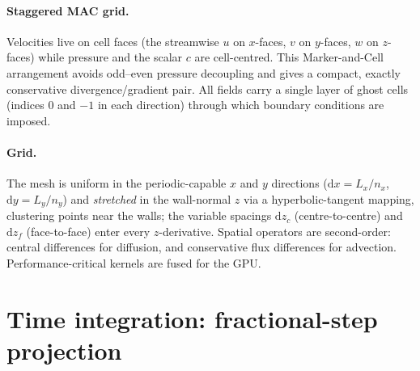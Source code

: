 \documentclass[11pt]{article}
\newcommand{\dd}{\mathrm{d}}
\begin{document}
\paragraph{Staggered MAC grid.} Velocities live on cell faces (the
streamwise $u$ on $x$-faces, $v$ on $y$-faces, $w$ on $z$-faces) while
pressure and the scalar $c$ are cell-centred. This Marker-and-Cell
arrangement avoids odd--even pressure decoupling and gives a compact,
exactly conservative divergence/gradient pair. All fields carry a single
layer of ghost cells (indices $0$ and $-1$ in each direction) through
which boundary conditions are imposed.

\paragraph{Grid.} The mesh is uniform in the periodic-capable
$x$ and $y$ directions ($\dd x = L_x/n_x$, $\dd y = L_y/n_y$) and
\emph{stretched} in the wall-normal $z$ via a hyperbolic-tangent
mapping, clustering points near the walls; the variable spacings
$\dd z_c$ (centre-to-centre) and $\dd z_f$ (face-to-face) enter every
$z$-derivative. Spatial operators are second-order:
central differences for diffusion, and conservative flux differences for
advection. Performance-critical kernels are fused for the GPU.

\section{Time integration: fractional-step projection}
\end{document}
